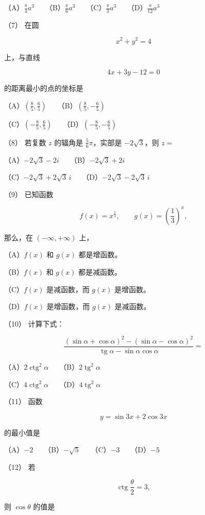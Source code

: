 \begin{question}
（A）$\frac\pi4a^3$　　（B）$\frac\pi6a^3$　　（C）$\frac\pi3a^3$　　（D）$\frac\pi{12}a^3$

（7） 在圆

\nopagebreak[4]
\[
x^2+y^2=4
\]

上，与直线

\nopagebreak[4]
\[
4x+3y-12=0
\]

的距离最小的点的坐标是

（A）$\left(\frac85,\frac65\right)$　　（B）$\left(\frac85,-\frac65\right)$

（C）$\left(-\frac85,\frac65\right)$　　（D）$\left(-\frac85,-\frac65\right)$

（8） 若复数 $z$ 的辐角是 $\frac56\pi$，实部是 $-2\sqrt3$，则 $z=$

（A）$-2\sqrt3-2i$　　（B）$-2\sqrt3+2i$

（C）$-2\sqrt3+2\sqrt3\,i$　　（D）$-2\sqrt3-2\sqrt3\,i$

（9） 已知函数

\nopagebreak[4]
\[
f(x)=x^{\frac13},\qquad g(x)=\left(\frac13\right)^x,
\]

那么，在 $(-\infty,+\infty)$ 上，

（A）$f(x)$ 和 $g(x)$ 都是增函数。

（B）$f(x)$ 和 $g(x)$ 都是减函数。

（C）$f(x)$ 是减函数，而 $g(x)$ 是增函数。

（D）$f(x)$ 是增函数，而 $g(x)$ 是减函数。

（10） 计算下式：

\nopagebreak[4]
\[
\frac{(\sin\alpha+\cos\alpha)^2-(\sin\alpha-\cos\alpha)^2}
{\operatorname{tg}\alpha-\sin\alpha\cos\alpha}
=
\]

（A）$2\operatorname{ctg}^2\alpha$　　（B）$2\operatorname{tg}^2\alpha$

（C）$4\operatorname{ctg}^2\alpha$　　（D）$4\operatorname{tg}^2\alpha$

（11） 函数

\nopagebreak[4]
\[
y=\sin3x+2\cos3x
\]

的最小值是

（A）$-2$　　（B）$-\sqrt5$　　（C）$-3$　　（D）$-5$

（12） 若

\nopagebreak[4]
\[
\operatorname{ctg}\frac\theta2=3,
\]

则 $\cos\theta$ 的值是


\end{question}
